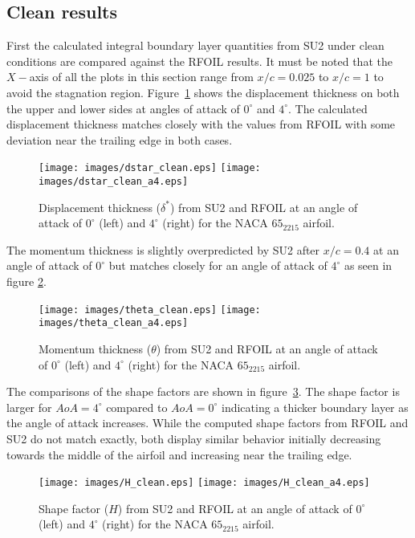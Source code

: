 \subsection{Clean results}
\noindent First the calculated integral boundary layer quantities from SU2 under clean conditions are compared against the RFOIL results. It must be noted that the $X-$axis of all the plots in this section range from $x/c=0.025$ to $x/c=1$ to avoid the stagnation region. Figure~\ref{fig:dstar_clean} shows the displacement thickness on both the upper and lower sides at angles of attack of $0^{\circ}$ and $4^{\circ}$. The calculated displacement thickness matches closely with the values from RFOIL with some deviation near the trailing edge in both cases. 
\begin{figure}[h!]
    \centering
    \texttt{[image: images/dstar\_clean.eps]} 
    \texttt{[image: images/dstar\_clean\_a4.eps]}
    \caption{Displacement thickness ($\delta^*$) from SU2 and RFOIL at an angle of attack of $0^{\circ}$ (left) and $4^{\circ}$ (right) for the NACA $65_2215$ airfoil.}
    \label{fig:dstar_clean}
\end{figure}
The momentum thickness is slightly overpredicted by SU2 after $x/c=0.4$ at an angle of attack of $0^{\circ}$ but matches closely for an angle of attack of $4^{\circ}$ as seen in figure \ref{fig:theta_clean}. 
\begin{figure}[h!]
    \centering
    \captionsetup{justification=centering}
    \texttt{[image: images/theta\_clean.eps]} 
    \texttt{[image: images/theta\_clean\_a4.eps]}
    \caption{Momentum thickness ($\theta$) from SU2 and RFOIL at an angle of attack of $0^{\circ}$ (left) and $4^{\circ}$ (right) for the NACA $65_2215$ airfoil.}
    \label{fig:theta_clean}
\end{figure}
The comparisons of the shape factors are shown in figure~\ref{fig:H_clean}. The shape factor is larger for $AoA=4^{\circ}$ compared to $AoA=0^{\circ}$ indicating a thicker boundary layer as the angle of attack increases. While the computed shape factors from RFOIL and SU2 do not match exactly, both display similar behavior initially decreasing towards the middle of the airfoil and increasing near the trailing edge.

\begin{figure}[h!]
    \centering
    \captionsetup{justification=centering}
    \texttt{[image: images/H\_clean.eps]} 
    \texttt{[image: images/H\_clean\_a4.eps]}
    \caption{Shape factor ($H$) from SU2 and RFOIL at an angle of attack of $0^{\circ}$ (left) and $4^{\circ}$ (right) for the NACA $65_2215$ airfoil.}
    \label{fig:H_clean}
\end{figure}

